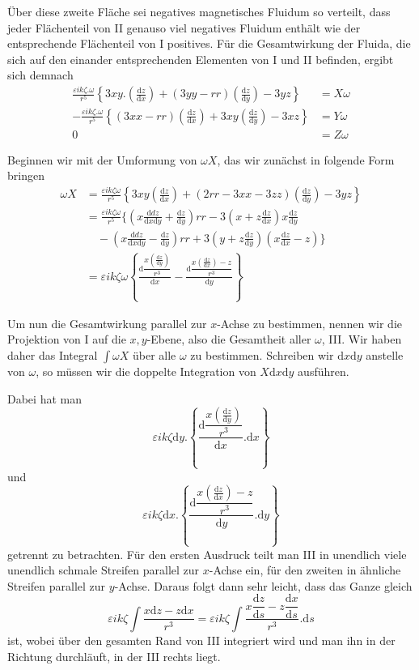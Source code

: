 Über diese zweite Fläche sei negatives magnetisches Fluidum so verteilt, dass jeder Flächenteil von II genauso viel negatives Fluidum enthält wie der entsprechende Flächenteil von I positives. Für die Gesamtwirkung der Fluida, die sich auf den einander entsprechenden Elementen von I und II befinden, ergibt sich demnach
\[
\begin{aligned}
\frac{\varepsilon ik\zeta.\omega}{r^5}\left\{3xy.\left(\frac{\mathrm dz}{\mathrm dx}\right)+(3yy-rr)\left(\frac{\mathrm dz}{\mathrm dy}\right)-3yz\right\}&=X\omega\\
-\frac{\varepsilon ik\zeta.\omega}{r^5}\left\{(3xx-rr)\left(\frac{\mathrm dz}{\mathrm dx}\right)+3xy\left(\frac{\mathrm dz}{\mathrm dy}\right)-3xz\right\}&=Y\omega\\
0&=Z\omega
\end{aligned}
\]

Beginnen wir mit der Umformung von $\omega X$, das wir zunächst in folgende Form bringen
\[
\begin{aligned}
\omega X&=\frac{\varepsilon ik\zeta\omega}{r^5}\left\{3xy\left(\frac{\mathrm dz}{\mathrm dx}\right)+(2rr-3xx-3zz)\left(\frac{\mathrm dz}{\mathrm dy}\right)-3yz\right\}\\
&=\frac{\varepsilon ik\zeta\omega}{r^5}\Big\{\left(x\frac{\mathrm ddz}{\mathrm dx\mathrm dy}+\frac{\mathrm dz}{\mathrm dy}\right)rr-3\left(x+z\frac{\mathrm dz}{\mathrm dx}\right)x\frac{\mathrm dz}{\mathrm dy}\\
&\quad-\left(x\frac{\mathrm ddz}{\mathrm dx\mathrm dy}-\frac{\mathrm dz}{\mathrm dy}\right)rr+3\left(y+z\frac{\mathrm dz}{\mathrm dy}\right)\left(x\frac{\mathrm dz}{\mathrm dx}-z\right)\Big\}\\
&=\varepsilon ik\zeta\omega\left\{\frac{\mathrm d\dfrac{x\left(\frac{\mathrm dz}{\mathrm dy}\right)}{r^3}}{\mathrm dx}-\frac{\mathrm d\dfrac{x\left(\frac{\mathrm dz}{\mathrm dx}\right)-z}{r^3}}{\mathrm dy}\right\}
\end{aligned}
\]

Um nun die Gesamtwirkung parallel zur $x$-Achse zu bestimmen, nennen wir die Projektion von I auf die $x,y$-Ebene, also die Gesamtheit aller $\omega$, III. Wir haben daher das Integral $\int\omega X$ über alle $\omega$ zu bestimmen. Schreiben wir $\mathrm dx\mathrm dy$ anstelle von $\omega$, so müssen wir die doppelte Integration von $X\mathrm dx\mathrm dy$ ausführen.

Dabei hat man
\[
\varepsilon ik\zeta\mathrm dy.\left\{\frac{\mathrm d\dfrac{x\left(\frac{\mathrm dz}{\mathrm dy}\right)}{r^3}}{\mathrm dx}.\mathrm dx\right\}
\]
und
\[
\varepsilon ik\zeta\mathrm dx.\left\{\frac{\mathrm d\dfrac{x\left(\frac{\mathrm dz}{\mathrm dx}\right)-z}{r^3}}{\mathrm dy}.\mathrm dy\right\}
\]
getrennt zu betrachten. Für den ersten Ausdruck teilt man III in unendlich viele unendlich schmale Streifen parallel zur $x$-Achse ein, für den zweiten in ähnliche Streifen parallel zur $y$-Achse. Daraus folgt dann sehr leicht, dass das Ganze gleich
\[
\varepsilon ik\zeta\int\frac{x\mathrm dz-z\mathrm dx}{r^3}=\varepsilon ik\zeta\int\frac{x\dfrac{\mathrm dz}{\mathrm ds}-z\dfrac{\mathrm dx}{\mathrm ds}}{r^3}.\mathrm ds
\]
ist, wobei über den gesamten Rand von III integriert wird und man ihn in der Richtung durchläuft, in der III rechts liegt.


